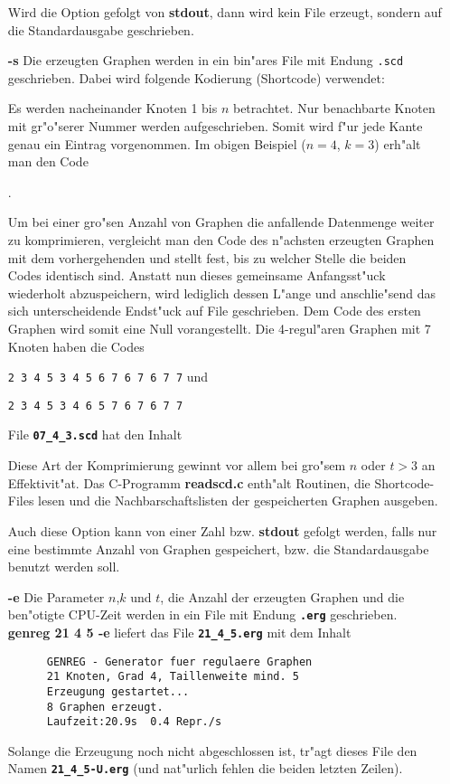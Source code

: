 \begin{itemize}
  Wird die Option gefolgt von {\bf stdout}, dann wird kein File
  erzeugt, sondern auf die Standardausgabe geschrieben.

 \item[\bf -s]
  Die erzeugten Graphen werden in ein bin"ares File mit Endung
  {\verb|.scd|} geschrieben. Dabei wird folgende Kodierung (Shortcode)
  verwendet:

  Es werden nacheinander Knoten 1 bis $n$ betrachtet.
  Nur benachbarte Knoten mit gr"o"serer Nummer werden aufgeschrieben.
  Somit wird f"ur jede Kante genau ein Eintrag vorgenommen. Im
  obigen Beispiel ($n=4$, $k=3$) erh"alt man den Code

  \hspace{1cm}{\tt 2 3 4 3 4 4}.

  Um bei einer gro"sen Anzahl von Graphen
  die anfallende Datenmenge weiter zu komprimieren,
  vergleicht man den Code des n"achsten erzeugten Graphen mit dem
  vorhergehenden und stellt fest, bis zu welcher Stelle die
  beiden Codes identisch sind. Anstatt nun dieses gemeinsame Anfangsst"uck
  wiederholt abzuspeichern, wird lediglich dessen L"ange und
  anschlie"send das sich unterscheidende Endst"uck auf File geschrieben.
  Dem Code des ersten Graphen wird somit eine Null vorangestellt.
  Die 4-regul"aren Graphen mit 7 Knoten haben die Codes

  \hspace{1cm} {\tt 2 3 4 5 3 4 5 6 7 6 7 6 7 7} und

  \hspace{1cm} {\tt 2 3 4 5 3 4 6 5 7 6 7 6 7 7}

  File {\bf \verb|07_4_3.scd|} hat den Inhalt

  \hspace{1cm}{\tt 0 2 3 4 5 3 4 5 6 7 6 7 6 7 7 6 6 5 7 6 7 6 7 7}

  Diese Art der Komprimierung gewinnt vor allem bei gro"sem
  $n$ oder $t\! >\! 3$ an Effektivit"at. Das C-Programm {\bf readscd.c}
  enth"alt Routinen, die Shortcode-Files lesen und die Nachbarschaftslisten
  der gespeicherten Graphen ausgeben.

  Auch diese Option kann von einer Zahl bzw. {\bf stdout}
  gefolgt werden,
  falls nur eine bestimmte Anzahl von Graphen gespeichert, bzw.
  die Standardausgabe benutzt werden soll.

 \item[\bf -e]
  Die Parameter $n$,$k$ und $t$, die Anzahl der erzeugten Graphen
  und die ben"otigte CPU-Zeit werden in ein File mit
  Endung {\bf \verb|.erg|} geschrieben.
  {\bf genreg 21 4 5 -e} liefert das File {\bf \verb|21_4_5.erg|}
  mit dem Inhalt
  \begin{verbatim}
	  GENREG - Generator fuer regulaere Graphen
	  21 Knoten, Grad 4, Taillenweite mind. 5
	  Erzeugung gestartet...
	  8 Graphen erzeugt.
	  Laufzeit:20.9s  0.4 Repr./s \end{verbatim}
  Solange die Erzeugung noch nicht abgeschlossen ist, tr"agt dieses File
  den Namen {\bf \verb|21_4_5-U.erg|} (und nat"urlich fehlen
  die beiden letzten Zeilen).


\end{itemize}
